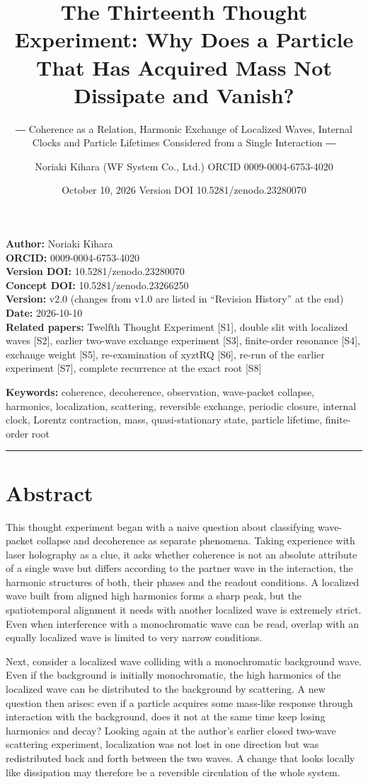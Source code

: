 \documentclass[
  a4paper,
]{article}
\title{The Thirteenth Thought Experiment: Why Does a Particle That Has
Acquired Mass Not Dissipate and Vanish?}
\subtitle{― Coherence as a Relation, Harmonic Exchange of Localized
Waves, Internal Clocks and Particle Lifetimes Considered from a Single
Interaction ―}
\author{Noriaki Kihara (WF System Co., Ltd.) ORCID 0009-0004-6753-4020}
\date{October 10, 2026 Version DOI 10.5281/zenodo.23280070}
\begin{document}
\maketitle

\textbf{Author:} Noriaki Kihara\\
\textbf{ORCID:} 0009-0004-6753-4020\\
\textbf{Version DOI:} 10.5281/zenodo.23280070\\
\textbf{Concept DOI:} 10.5281/zenodo.23266250\\
\textbf{Version:} v2.0 (changes from v1.0 are listed in ``Revision
History'' at the end)\\
\textbf{Date:} 2026-10-10\\
\textbf{Related papers:} Twelfth Thought Experiment {[}S1{]}, double
slit with localized waves {[}S2{]}, earlier two-wave exchange experiment
{[}S3{]}, finite-order resonance {[}S4{]}, exchange weight {[}S5{]},
re-examination of xyztRQ {[}S6{]}, re-run of the earlier experiment
{[}S7{]}, complete recurrence at the exact root {[}S8{]}

\textbf{Keywords:} coherence, decoherence, observation, wave-packet
collapse, harmonics, localization, scattering, reversible exchange,
periodic closure, internal clock, Lorentz contraction, mass,
quasi-stationary state, particle lifetime, finite-order root

\begin{center}\rule{0.5\linewidth}{0.5pt}\end{center}

\section{Abstract}\label{abstract}

This thought experiment began with a naive question about classifying
wave-packet collapse and decoherence as separate phenomena. Taking
experience with laser holography as a clue, it asks whether coherence is
not an absolute attribute of a single wave but differs according to the
partner wave in the interaction, the harmonic structures of both, their
phases and the readout conditions. A localized wave built from aligned
high harmonics forms a sharp peak, but the spatiotemporal alignment it
needs with another localized wave is extremely strict. Even when
interference with a monochromatic wave can be read, overlap with an
equally localized wave is limited to very narrow conditions.

Next, consider a localized wave colliding with a monochromatic
background wave. Even if the background is initially monochromatic, the
high harmonics of the localized wave can be distributed to the
background by scattering. A new question then arises: even if a particle
acquires some mass-like response through interaction with the
background, does it not at the same time keep losing harmonics and
decay? Looking again at the author's earlier closed two-wave scattering
experiment, localization was not lost in one direction but was
redistributed back and forth between the two waves. A change that looks
locally like dissipation may therefore be a reversible circulation of
the whole system.
\end{document}
